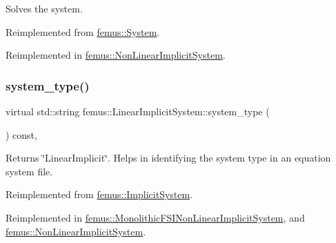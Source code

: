 Solves the system. 

Reimplemented from \mbox{\hyperlink{classfemus_1_1_system_a223d0ee32326556800eeb423bd9abbfb}{femus\+::\+System}}.



Reimplemented in \mbox{\hyperlink{classfemus_1_1_non_linear_implicit_system_a4abfe53698e95f1075194cf3a7ce790a}{femus\+::\+Non\+Linear\+Implicit\+System}}.

\mbox{\label{classfemus_1_1_linear_implicit_system_a45df3966aab87bd06da49c78897a6648}} 
\subsubsection{\texorpdfstring{system\+\_\+type()}{system\_type()}}
{\footnotesize\ttfamily virtual std\+::string femus\+::\+Linear\+Implicit\+System\+::system\+\_\+type (\begin{DoxyParamCaption}{ }\end{DoxyParamCaption}) const\hspace{0.3cm}{\ttfamily [inline]}, {\ttfamily [virtual]}}

\begin{DoxyReturn}{Returns}
{\ttfamily \char`\"{}\+Linear\+Implicit\char`\"{}}. Helps in identifying the system type in an equation system file. 
\end{DoxyReturn}


Reimplemented from \mbox{\hyperlink{classfemus_1_1_implicit_system_aee5e08a09a2d289aa777914018931592}{femus\+::\+Implicit\+System}}.



Reimplemented in \mbox{\hyperlink{classfemus_1_1_monolithic_f_s_i_non_linear_implicit_system_a29bb0bdaf1eec888af05e8e57469faf4}{femus\+::\+Monolithic\+F\+S\+I\+Non\+Linear\+Implicit\+System}}, and \mbox{\hyperlink{classfemus_1_1_non_linear_implicit_system_a8f4727b8b763bdac9f58b4c9dbb097be}{femus\+::\+Non\+Linear\+Implicit\+System}}.

\mbox{\label{classfemus_1_1_linear_implicit_system_a74eca0812307b256029997b2ce504f5e}} 
